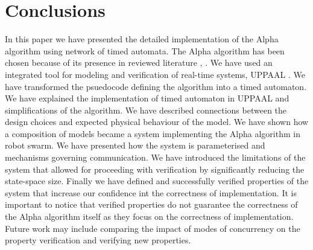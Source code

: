 \section{Conclusions}
In this paper we have presented the detailed implementation of the Alpha algorithm \cite{Minimalist_Coherent_Swarming_of_Wireless_Networked_Autonomous_Mobile_Robots} using network of timed automata. The Alpha algorithm has been chosen because of its presence in reviewed literature \cite{On_Formal_Specification_of_Emergent_Behaviours_in_Swarm_Robotic_Systems}, \cite{Towards_Temporal_Verification_of_Emergent_Behaviours_in_Swarm_Robotic_Systems}. We have used an integrated tool for modeling and verification of real-time systems, UPPAAL \cite{UPPAAL_in_a_Nutshell}. We have transformed the psuedocode defining the algorithm into a timed automaton. We have explained the implementation of timed automaton in UPPAAL and simplifications of the algorithm. We have described connections between the design choices and expected physical behaviour of the model. We have shown how a composition of models became a system implementing the Alpha algorithm in robot swarm. We have presented how the system is parameterised and mechanisms governing communication. We have introduced the limitations of the system that allowed for proceeding with verification by significantly reducing the state-space size. Finally we have defined and successfully verified properties of the system that increase our confidence int the correctness of implementation. It is important to notice that verified properties do not guarantee the correctness of the Alpha algorithm itself as they focus on the correctness of implementation. Future work may include comparing the impact of modes of concurrency on the property verification and verifying new properties.

